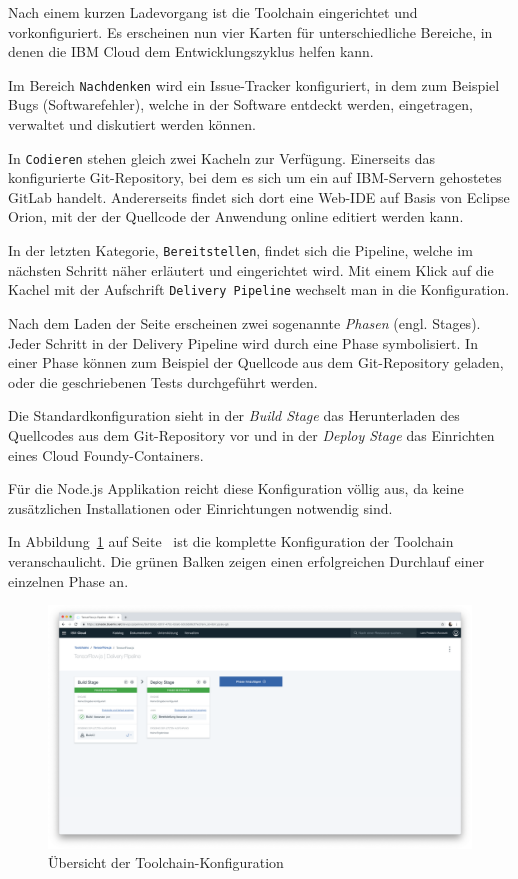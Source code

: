 Nach einem kurzen Ladevorgang ist die Toolchain eingerichtet und vorkonfiguriert. Es erscheinen nun vier Karten für
unterschiedliche Bereiche, in denen die IBM Cloud dem Entwicklungszyklus helfen kann.

Im Bereich \texttt{Nachdenken} wird ein Issue-Tracker konfiguriert, in dem zum Beispiel Bugs (Softwarefehler), welche
in der Software entdeckt werden, eingetragen, verwaltet und diskutiert werden können.

In \texttt{Codieren} stehen gleich zwei Kacheln zur Verfügung. Einerseits das konfigurierte Git-Repository, bei dem es
sich um ein auf IBM-Servern gehostetes GitLab handelt. Andererseits findet sich dort eine Web-IDE auf Basis von Eclipse
Orion, mit der der Quellcode der Anwendung online editiert werden kann.

In der letzten Kategorie, \texttt{Bereitstellen}, findet sich die Pipeline, welche im nächsten Schritt näher erläutert
und eingerichtet wird. Mit einem Klick auf die Kachel mit der Aufschrift \texttt{Delivery Pipeline} wechselt man in die
Konfiguration.

Nach dem Laden der Seite erscheinen zwei sogenannte \textit{Phasen} (engl. Stages). Jeder Schritt in der Delivery Pipeline
wird durch eine Phase symbolisiert. In einer Phase können zum Beispiel der Quellcode aus dem Git-Repository geladen, oder
die geschriebenen Tests durchgeführt werden.

Die Standardkonfiguration sieht in der \textit{Build Stage} das Herunterladen des Quellcodes aus dem Git-Repository vor
und in der \textit{Deploy Stage} das Einrichten eines Cloud Foundy-Containers.

Für die Node.js Applikation reicht diese Konfiguration völlig aus, da keine zusätzlichen Installationen oder Einrichtungen
notwendig sind.

In Abbildung~\ref{fig:umsetzung_toolchain_pipeline} auf Seite~\pageref{fig:umsetzung_toolchain_pipeline} ist die
komplette Konfiguration der Toolchain veranschaulicht. Die grünen Balken zeigen einen erfolgreichen Durchlauf einer
einzelnen Phase an.

\begin{figure}[h]
    \centering
    \includegraphics[width=\textwidth]{images/kapitel_3/toolchain_pipeline.png}
    \caption{Übersicht der Toolchain-Konfiguration}
    \label{fig:umsetzung_toolchain_pipeline}
\end{figure}

